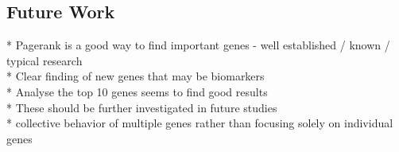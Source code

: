 \subsection{Future Work} \label{subsec:future_work}
{\color{lightgray}
* Pagerank is a good way to find important genes - well established / known / typical research \\
* Clear finding of new genes that may be biomarkers\\
* Analyse the top 10 genes seems to find good results\\

* These should be further investigated in future studies\\
*  collective behavior of multiple genes rather than focusing solely on individual genes
}